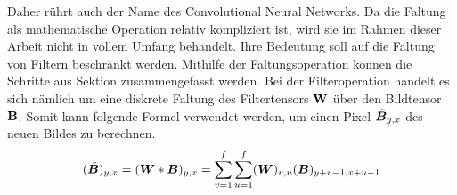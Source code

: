Daher rührt auch der Name des Convolutional Neural Networks.
Da die Faltung als mathematische Operation relativ kompliziert ist, wird sie im
Rahmen dieser Arbeit nicht in vollem Umfang behandelt.
Ihre Bedeutung soll auf die Faltung von Filtern beschränkt werden.
\para{}
Mithilfe der Faltungsoperation können die Schritte aus Sektion
 zusammengefasst werden.
Bei der Filteroperation handelt es sich nämlich um eine diskrete Faltung des
Filtertensors $\mathbf{W}$ über den Bildtensor $\mathbf{B}$. Somit kann
folgende Formel verwendet werden, um einen Pixel $\tilde{\bm{B}}_{y,x}$ des neuen Bildes zu berechnen.
\\
\begin{equation}
  (\tilde{\bm{B}})_{y,x} = (\bm{W} * \bm{B})_{y,x} = \sum_{v=1}^{f} \sum_{u=1}^{f} (\bm{W})_{v,u}(\bm{B})_{y+v-1,x+u-1}
\end{equation}
\para{}

